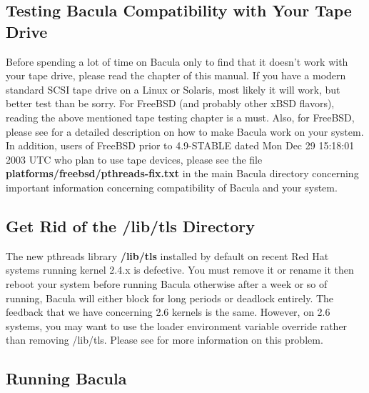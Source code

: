 {{{{{{{{{\subsection*{Testing Bacula Compatibility with Your Tape Drive}

Before spending a lot of time on Bacula only to find that it doesn't work with
your tape drive, please read the 
chapter of this manual. If you have a modern standard SCSI tape drive on a
Linux or Solaris, most likely it will work, but better test than be sorry. For
FreeBSD (and probably other xBSD flavors), reading the above mentioned tape
testing chapter is a must. Also, for FreeBSD, please see 
 for a
detailed description on how to make Bacula work on your system. In addition,
users of FreeBSD prior to 4.9-STABLE dated Mon Dec 29 15:18:01 2003 UTC who
plan to use tape devices, please see the file {\bf
platforms/freebsd/pthreads-fix.txt} in the main Bacula directory concerning
important information concerning compatibility of Bacula and your system. 
\label{notls}

\subsection*{Get Rid of the /lib/tls Directory}

The new pthreads library {\bf /lib/tls} installed by default on recent Red Hat
systems running kernel 2.4.x is defective. You must remove it or rename it
then reboot your system before running Bacula otherwise after a week or so of
running, Bacula will either block for long periods or deadlock entirely. The
feedback that we have concerning 2.6 kernels is the same. However, on 2.6
systems, you may want to use the loader environment variable override rather
than removing /lib/tls. Please see 
 for more
information on this problem. 
\label{Running1}

\subsection*{Running Bacula}

}}}}}}}}}
